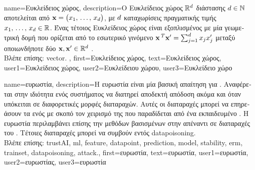{name={\foreignlanguage{greek}{Ευκλείδειος χώρος}}, 
	description={\foreignlanguage{greek}{Ο Ευκλείδειος χώρος} 
		$\mathbb{R}^{d}$ \foreignlanguage{greek}{διάστασης $d \in \mathbb{N}$ αποτελείται 
		από}  ${\bf x}= \big(x_{1}, \,\ldots, \,x_{d}\big)$, \foreignlanguage{greek}{με $d$ 
		καταχωρίσεις πραγματικής τιμής $x_{1}, \,\ldots, \,x_{d} \in \mathbb{R}$. 
		Ένας τέτοιος Ευκλείδειος χώρος είναι εξοπλισμένος με μία γεωμετρική δομή 
		που ορίζεται από το εσωτερικό γινόμενο 
		${\bf x}\,^{T} {\bf x}' = \sum_{j=1}^{d} x_{j} x'_{j}$ 
		μεταξύ οποιωνδήποτε δύο}  
		${\bf x},{\bf x}' \in \mathbb{R}^{d}$ \cite{RudinBookPrinciplesMatheAnalysis}. \\
		\foreignlanguage{greek}{Βλέπε επίσης:} \gls{vector}. },
	first={\foreignlanguage{greek}{Ευκλείδειος χώρος}}, 
	text={\foreignlanguage{greek}{Ευκλείδειος χώρος}},
	user1={\foreignlanguage{greek}{Ευκλείδειος χώρος}}, %
  	user2={\foreignlanguage{greek}{Ευκλείδειου χώρου}}, %
	user3={\foreignlanguage{greek}{Ευ\-κλεί\-δει\-ο χώρο}} %
}

{name={\foreignlanguage{greek}{ευρωστία}},
	description={\foreignlanguage{greek}{Η ευρωστία είναι μία βασική απαίτηση για} 
		. \foreignlanguage{greek}{Αναφέρεται στην ιδιότητα ενός συστήματος}  
		\foreignlanguage{greek}{να διατηρεί αποδεκτή απόδοση ακόμα και όταν υπόκειται σε διαφορετικές μορφές 
		διαταραχών. Αυτές οι διαταραχές μπορεί να επηρεάσουν τα}  \foreignlanguage{greek}{ενός} 
		 \foreignlanguage{greek}{με σκοπό τον χειρισμό της}  
		\foreignlanguage{greek}{που παραδίδεται από ένα εκπαιδευμένο}  . 
		\foreignlanguage{greek}{Η ευρωστία περιλαμβάνει επίσης την}  \foreignlanguage{greek}{μεθόδων 
		βασισμένων στην}  \foreignlanguage{greek}{απέναντι σε διαταραχές του} . 
		\foreignlanguage{greek}{Τέτοιες διαταραχές μπορεί να συμβούν εντός}  \gls{datapoisoning}. \\
		\foreignlanguage{greek}{Βλέπε επίσης:} \gls{trustAI}, \gls{ml}, \gls{feature}, \gls{datapoint}, \gls{prediction}, 
		\gls{model}, \gls{stability}, \gls{erm}, \gls{trainset}, \gls{datapoisoning}, \gls{attack}.}, 
	first={\foreignlanguage{greek}{ευρωστία}}, 
	text={\foreignlanguage{greek}{ευρωστία}},
	user1={\foreignlanguage{greek}{ευρωστία}}, %
  	user2={\foreignlanguage{greek}{ευρωστίας}}, %
	user3={\foreignlanguage{greek}{ευρωστία}} %
}

